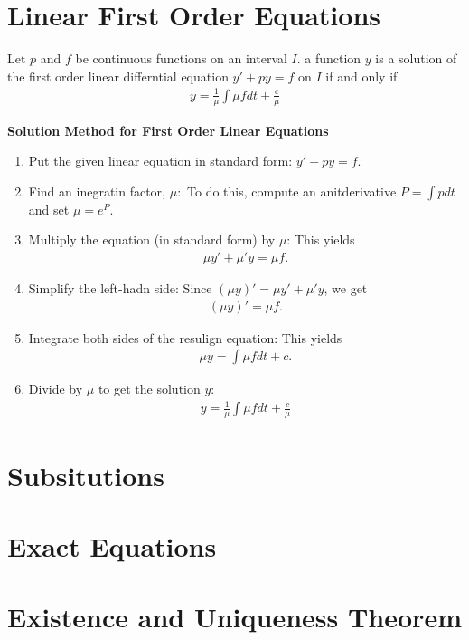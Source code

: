 \documentclass[12pt,a4paper]{report}
\begin{document}
\section{Linear First Order Equations}

\begin{theorem}Let $p$ and $f$ be continuous functions on an interval $I$.   a function $y$ is a solution of the first order linear differntial equation $y'+py=f$ on $I$ if and only if 
\begin{align*}
	y=\frac{1}{\mu}\int \mu f dt + \frac{c}{\mu}
\end{align*}

\end{theorem}

\begin{center}
\large\textbf{Solution Method for First Order Linear Equations}
\end{center}

\begin{enumerate}
	\item Put the given linear equation in standard form: $y'+py=f$.
	\item Find an inegratin factor, $\mu:$ To do this, compute an anitderivative $P=\int p dt$ and set $\mu=e^P$.
	\item Multiply the equation (in standard form) by $\mu$: This yields
	\begin{align*}
		\mu y'+\mu'y = \mu f.
	\end{align*}
	
	\item Simplify the left-hadn side:  Since $(\mu y)'=\mu y'+\mu'y$, we get
	\begin{align*}
		(\mu y)'=\mu f.
	\end{align*}
	\item Integrate both sides of the resulign equation: This yields
	\begin{align*}
		\mu y=\int \mu f dt+c.
	\end{align*}
	
	\item Divide by $\mu$ to get the solution $y$:
	\begin{align*}
		y = \frac{1}{\mu}\int \mu f dt+\frac{c}{\mu}
	\end{align*}
\end{enumerate}

\section{Subsitutions}

\section{Exact Equations}

\section{Existence and Uniqueness Theorem}
\end{document}

